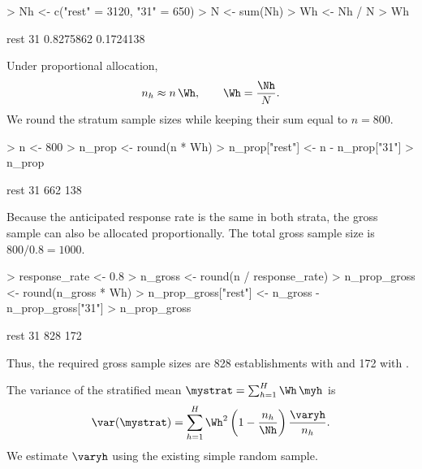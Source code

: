 \begin{Problem}
\begin{Subtask}
\begin{Solution}
\begin{Schunk}
\begin{Sinput}
> Nh <- c("rest" = 3120, "31" = 650)
> N <- sum(Nh)
> Wh <- Nh / N
> Wh
\end{Sinput}
\begin{Soutput}
     rest        31 
0.8275862 0.1724138 
\end{Soutput}
\end{Schunk}

        Under proportional allocation,
        \begin{equation*}
            n_h \approx n \, \Wh, \qquad \Wh = \frac{\Nh}{N}.
        \end{equation*}
        We round the stratum sample sizes while keeping their sum equal to
        $n = 800$.

\begin{Schunk}
\begin{Sinput}
> n <- 800
> n_prop <- round(n * Wh)
> n_prop["rest"] <- n - n_prop["31"]
> n_prop
\end{Sinput}
\begin{Soutput}
rest   31 
 662  138 
\end{Soutput}
\end{Schunk}

        Because the anticipated response rate is the same in both strata, the
        gross sample can also be allocated proportionally. The total gross
        sample size is $800/0.8 = 1000$.

\begin{Schunk}
\begin{Sinput}
> response_rate <- 0.8
> n_gross <- round(n / response_rate)
> n_prop_gross <- round(n_gross * Wh)
> n_prop_gross["rest"] <- n_gross - n_prop_gross["31"]
> n_prop_gross
\end{Sinput}
\begin{Soutput}
rest   31 
 828  172 
\end{Soutput}
\end{Schunk}

        Thus, the required gross sample sizes are
        828 establishments with  and
        172 with .

        The variance of the stratified mean $\mystrat = \sum_{h = 1}^H \Wh \,
        \myh$ is
        \begin{equation*}
            \var(\mystrat) = \sum_{h = 1}^H \Wh^2
              \left(1 - \frac{n_h}{\Nh}\right)\frac{\varyh}{n_h}.
        \end{equation*}
        We estimate $\varyh$ using the existing simple random sample.


\end{Solution}
\end{Subtask}
\end{Problem}
